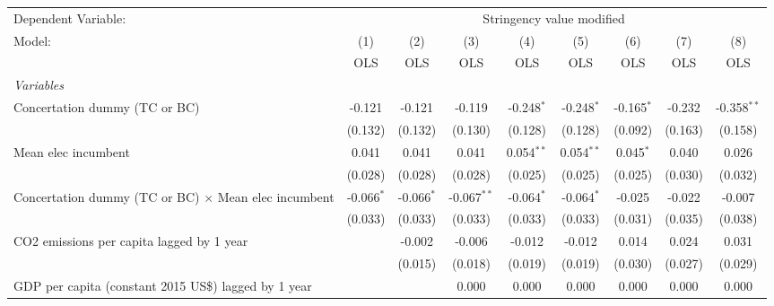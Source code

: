 
\begingroup
\centering
\begin{tabular}{lcccccccc}
   \toprule
   Dependent Variable: & \multicolumn{8}{c}{Stringency value modified}\\
   Model:                                                      & (1)          & (2)          & (3)           & (4)          & (5)          & (6)          & (7)          & (8)\\  
                                                               &  OLS         & OLS          & OLS           & OLS          & OLS          & OLS          & OLS          & OLS\\  
   \midrule
   \emph{Variables}\\
   Concertation dummy (TC or BC)                               & -0.121       & -0.121       & -0.119        & -0.248$^{*}$ & -0.248$^{*}$ & -0.165$^{*}$ & -0.232       & -0.358$^{**}$\\   
                                                               & (0.132)      & (0.132)      & (0.130)       & (0.128)      & (0.128)      & (0.092)      & (0.163)      & (0.158)\\   
   Mean elec incumbent                                         & 0.041        & 0.041        & 0.041         & 0.054$^{**}$ & 0.054$^{**}$ & 0.045$^{*}$  & 0.040        & 0.026\\   
                                                               & (0.028)      & (0.028)      & (0.028)       & (0.025)      & (0.025)      & (0.025)      & (0.030)      & (0.032)\\   
   Concertation dummy (TC or BC) $\times$ Mean elec incumbent  & -0.066$^{*}$ & -0.066$^{*}$ & -0.067$^{**}$ & -0.064$^{*}$ & -0.064$^{*}$ & -0.025       & -0.022       & -0.007\\   
                                                               & (0.033)      & (0.033)      & (0.033)       & (0.033)      & (0.033)      & (0.031)      & (0.035)      & (0.038)\\   
   CO2 emissions per capita lagged by 1 year                   &              & -0.002       & -0.006        & -0.012       & -0.012       & 0.014        & 0.024        & 0.031\\   
                                                               &              & (0.015)      & (0.018)       & (0.019)      & (0.019)      & (0.030)      & (0.027)      & (0.029)\\   
   GDP per capita (constant 2015 US\$) lagged by 1 year        &              &              & 0.000         & 0.000        & 0.000        & 0.000        & 0.000        & 0.000\\   

\end{tabular}
